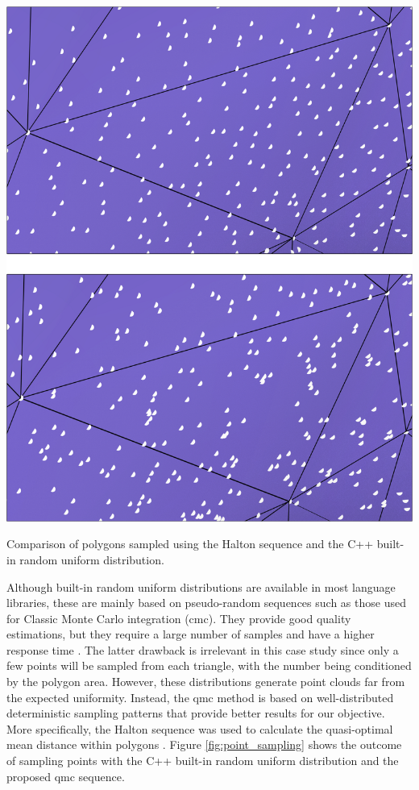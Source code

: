 \begin{marginfigure}[0cm]
    \centering
    \includegraphics[width=\linewidth]{figs/lidar_optimization/point_sampling.png}
	\caption{Comparison of polygons sampled using the Halton sequence and the C++ built-in random uniform distribution.}
	\label{fig:point_sampling}
\end{marginfigure}
Although built-in random uniform distributions are available in most language libraries, these are mainly based on pseudo-random sequences such as those used for Classic Monte Carlo integration (\acrshort{cmc}). They provide good quality estimations, but they require a large number of samples and have a higher response time \cite{marques_optimal_2019}. The latter drawback is irrelevant in this case study since only a few points will be sampled from each triangle, with the number being conditioned by the polygon area. However, these distributions generate point clouds far from the expected uniformity. Instead, the \acrshort{qmc} method is based on well-distributed deterministic sampling patterns that provide better results for our objective. More specifically, the Halton sequence was used to calculate the quasi-optimal mean distance within polygons \cite{burkardt_halton_2010}. Figure \ref{fig:point_sampling} shows the outcome of sampling points with the C++ built-in random uniform distribution and the proposed \acrshort{qmc} sequence.

